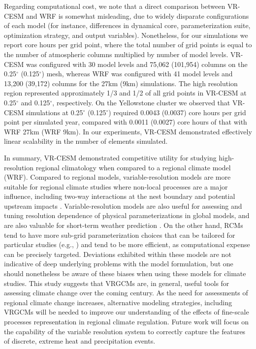 Regarding computational cost, we note that a direct comparison between VR-CESM and WRF is somewhat misleading, due to widely disparate configurations of each model (for instance, differences in dynamical core, parameterization suite, optimization strategy, and output variables). Nonetheless, for our simulations we report core hours per grid point, where the total number of grid points is equal to the number of atmospheric columns multiplied by number of model levels.  VR-CESM was configured with 30 model levels and 75,062 (101,954) columns on the 0.25$^\circ$ (0.125$^\circ$) mesh, whereas WRF was configured with 41 model levels and 13,200 (39,172) columns for the 27km (9km) simulations.  The high resolution region represented approximately 1/3 and 1/2 of all grid points in VR-CESM at 0.25$^\circ$ and 0.125$^\circ$, respectively.  On the Yellowstone cluster we observed that VR-CESM simulations at 0.25$^\circ$ (0.125$^\circ$) required 0.0043 (0.0037) core hours per grid point per simulated year, compared with 0.0011 (0.0027) core hours of that with WRF 27km (WRF 9km). In our experiments, VR-CESM demonstrated effectively linear scalability in the number of elements simulated.

In summary, VR-CESM demonstrated competitive utility for studying high-resolution regional climatology when compared to a regional climate model (WRF). Compared to regional models, variable-resolution models are more suitable for regional climate studies where non-local processes are a major influence, including two-way interactions at the nest boundary and potential upstream impacts \cite{sakaguchi2015exploring}.  Variable-resolution models are also useful for assessing and tuning resolution dependence of physical parameterizations in global models, and are also valuable for short-term weather prediction \cite{zarzycki2015experimental}. On the other hand, RCMs tend to have more sub-grid parameterization choices that can be tailored for particular studies (e.g., \cite{cassano2011performance}) and tend to be more efficient, as computational expense can be precisely targeted. Deviations exhibited within these models are not indicative of deep underlying problems with the model formulation, but one should nonetheless be aware of these biases when using these models for climate studies. This study suggests that VRGCMs are, in general, useful tools for assessing climate change over the coming century. As the need for assessments of regional climate change increases, alternative modeling strategies, including VRGCMs will be needed to improve our understanding of the effects of fine-scale processes representation in regional climate regulation. Future work will focus on the capability of the variable resolution system to correctly capture the features of discrete, extreme heat and precipitation events.

